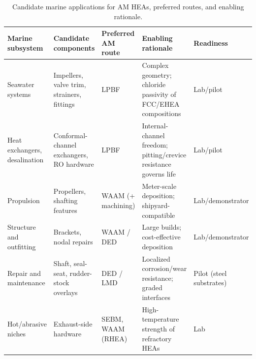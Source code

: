 \begin{table}[t]
\centering
\caption{Candidate marine applications for AM HEAs, preferred routes, and enabling rationale.}
\label{tab:applications}
\footnotesize
\begin{tabularx}{\textwidth}{@{}lXXXl@{}}
\toprule
Marine subsystem & Candidate components & Preferred AM route & Enabling rationale & Readiness \\
\midrule
Seawater systems & Impellers, valve trim, strainers, fittings & LPBF & Complex geometry; chloride passivity of FCC/EHEA compositions \cite{cagirici2024,lpbf_cantor_2024} & Lab/pilot \\
Heat exchangers, desalination & Conformal-channel exchangers, RO hardware & LPBF & Internal-channel freedom; pitting/crevice resistance governs life \cite{cagirici2024} & Lab/pilot \\
Propulsion & Propellers, shafting features & WAAM (+ machining) & Meter-scale deposition; shipyard-compatible \cite{raultaiwade2021} & Lab/demonstrator \\
Structure and outfitting & Brackets, nodal repairs & WAAM / DED & Large builds; cost-effective deposition \cite{raultaiwade2021} & Lab/demonstrator \\
Repair and maintenance & Shaft, seal-seat, rudder-stock overlays & DED / LMD & Localized corrosion/wear resistance; graded interfaces \cite{jiang2019clad} & Pilot (steel substrates) \\
Hot/abrasive niches & Exhaust-side hardware & SEBM, WAAM (RHEA) & High-temperature strength of refractory HEAs \cite{liu2021waam,abdullah2024rhea} & Lab \\
\bottomrule
\end{tabularx}
\end{table}
